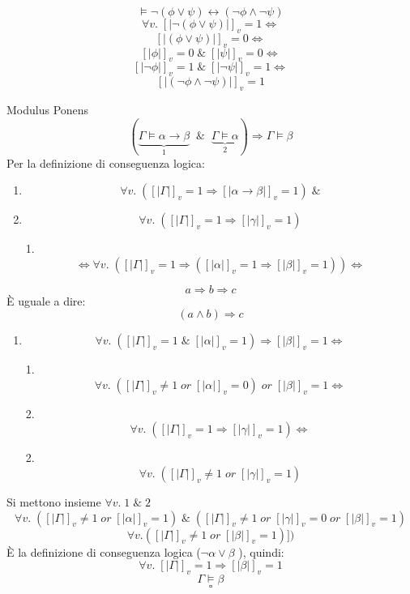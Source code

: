 \documentclass{article}
\theoremstyle{break}
\theoremstyle{break}
\theoremstyle{break}
\theoremstyle{break}
\begin{document}
\begin{figure}[H]
    \begin{exercise}
        \[
            \models \neg (\phi \vee \psi) \leftrightarrow (\neg \phi \wedge \neg \psi)
        \] 
        \[
            \forall v.\; [|\neg (\phi \vee \psi)|]_v=1 \Leftrightarrow
        \] 
        \[
            [|(\phi \vee \psi)|]_v=0 \Leftrightarrow
        \] 
        \[
            [|\phi|]_v=0\; \&\; [|\psi|]_v=0 \Leftrightarrow
        \] 
        \[
            [|\neg \phi|]_v=1 \; \&\; [|\neg \psi|]_v=1 \Leftrightarrow
        \] 
        \[
            [|(\neg \phi \wedge \neg \psi)|]_v=1
        \] 
    \end{exercise}
\end{figure}
\begin{exercise}
    Modulus Ponens
    \[
        (\underbrace{\Gamma \models \alpha \to \beta}_{1}\;\;\&\;\; \underbrace{\Gamma \models \alpha}_{2}) \Rightarrow \Gamma \models \beta
    \] 
    Per la definizione di conseguenza logica:
    \begin{enumerate}
        \item \[
                \forall v.\; ([|\Gamma|]_v=1 \Rightarrow [|\alpha \to \beta|]_v=1) \;\&
        \] 
        \item \[
                \forall v.\; ([|\Gamma|]_v=1 \Rightarrow [|\gamma|]_v=1)
        \] 
    \item[1.] \[
            \Leftrightarrow \forall v.\; ([|\Gamma|]_v=1 \Rightarrow ([|\alpha|]_v=1 \Rightarrow [|\beta|]_v=1)) \Leftrightarrow
    \] 
    \end{enumerate}
    \begin{define}
        \[
        a \Rightarrow b \Rightarrow c
        \] 
        È uguale a dire:
        \[
            (a \wedge b) \Rightarrow c
        \] 
    \end{define}
    \begin{enumerate}
        \item 
        \[
            \forall v.\; ([|\Gamma|]_v=1\;\&\;[|\alpha|]_v=1) \Rightarrow [|\beta|]_v=1 \Leftrightarrow
        \] 
    \item[1.]\[
            \forall v.\; ([|\Gamma|]_v \neq 1\; or\; [|\alpha|]_v=0)\; or\; [|\beta|]_v=1 \Leftrightarrow
    \] 
\item[2.]\[
        \forall v.\; ([|\Gamma|]_v=1 \Rightarrow [|\gamma|]_v = 1) \Leftrightarrow
\]
\item[2.]
\[
   \forall v.\; ([|\Gamma|]_v \neq 1\; or\; [|\gamma|]_v=1)  
\] 
    \end{enumerate}
    Si mettono insieme \(\forall v.\; 1\; \&\; 2 \) 
    \[
        \forall v.\; ([|\Gamma|]_v \neq 1\; or\; [|\alpha|]_v=1)\; \&\; ([|\Gamma|]_v \neq 1\; or\; [|\gamma|]_v=0\; or\; [|\beta|]_v=1)
    \] 
    \[
        \forall v.([|\Gamma|]_v \neq 1\; or\; [|\beta|]_v=1)])
    \]
    È la definizione di conseguenza logica (\( \neg \alpha \vee \beta \) ), quindi:
    \[
        \forall v. \;[|\Gamma|]_v=1 \Rightarrow [|\beta|]_v=1
    \] 
    \[
    \Gamma \models \beta
    \] 
    \[
    \square
    \]  
\end{exercise}
\end{document}
